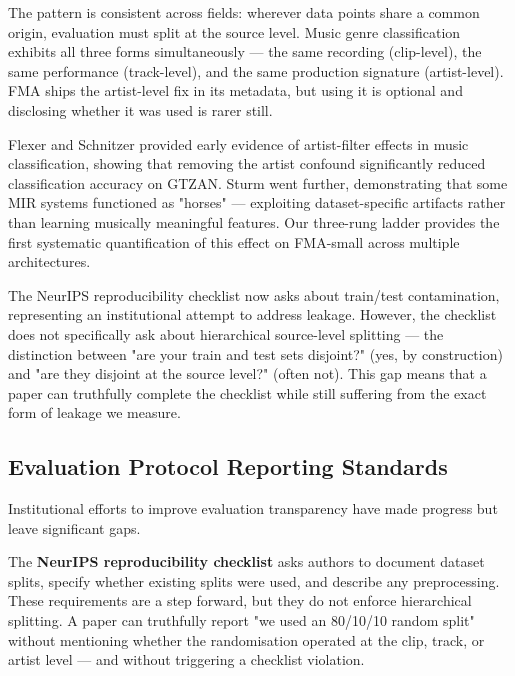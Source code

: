 \documentclass[conference]{IEEEtran}
\begin{document}
The pattern is consistent across fields: wherever data points share a
common origin, evaluation must split at the source level. Music genre
classification exhibits all three forms simultaneously --- the same
recording (clip-level), the same performance (track-level), and the same
production signature (artist-level). FMA ships the artist-level fix in
its metadata, but using it is optional and disclosing whether it was
used is rarer still.

Flexer and Schnitzer \citep{flexer2007closer} provided early evidence of
artist-filter effects in music classification, showing that removing the
artist confound significantly reduced classification accuracy on GTZAN.
Sturm \citep{sturm2014simple} went further, demonstrating that some MIR
systems functioned as "horses" --- exploiting dataset-specific
artifacts rather than learning musically meaningful features. Our
three-rung ladder provides the first systematic quantification of this
effect on FMA-small across multiple architectures.

The NeurIPS reproducibility checklist \citep{pineau2021neurips} now asks
about train/test contamination, representing an institutional attempt to
address leakage. However, the checklist does not specifically ask about
hierarchical source-level splitting --- the distinction between "are
your train and test sets disjoint?" (yes, by construction) and "are they
disjoint at the source level?" (often not). This gap means that a paper
can truthfully complete the checklist while still suffering from the
exact form of leakage we measure.

\subsection{Evaluation Protocol Reporting
Standards}\label{i.-evaluation-protocol-reporting-standards}

Institutional efforts to improve evaluation transparency have made
progress but leave significant gaps.

The \textbf{NeurIPS reproducibility checklist} \citep{pineau2021neurips}
asks authors to document dataset splits, specify whether existing splits
were used, and describe any preprocessing. These requirements are a step
forward, but they do not enforce hierarchical splitting. A paper can
truthfully report "we used an 80/10/10 random split" without mentioning
whether the randomisation operated at the clip, track, or artist level
--- and without triggering a checklist violation.
\end{document}
